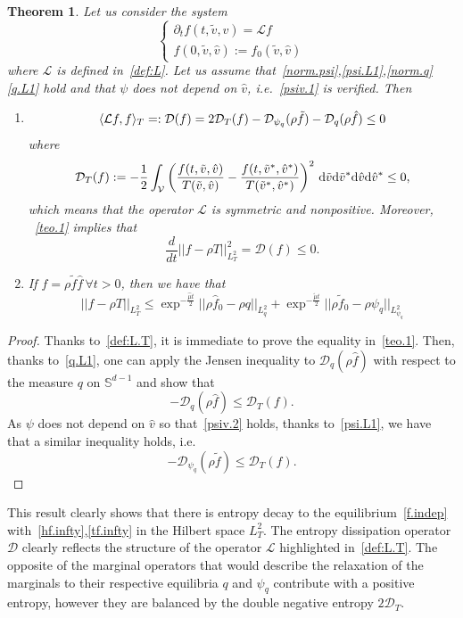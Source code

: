 \documentclass[a4paper]{article}
\theoremstyle{Theorem}\newtheorem{proposition}{Proposition}[section]
\theoremstyle{Remark}\newtheorem{remark}{Remark}[section]
\theoremstyle{Theorem}\newtheorem{theorem}{Theorem}[section]
\DeclarePairedDelimiter\ave{\langle}{\rangle}
\newcommand{\hv}{\hat{v}}
\newcommand{\tv}{\tilde{v}}
\newcommand{\hf}{\hat{f}}
\newcommand{\tf}{\tilde{f}}
\newcommand{\hmu}{\hat{\mu}}
\newcommand{\tmu}{\tilde{\mu}}
\newcommand{\intV}{\int_{\mathcal{V}}}
\begin{document}
\begin{theorem}
Let us consider the system
\begin{equation*}
    \begin{cases}
        \partial_t f (t,\tv,\hv) = \mathcal{L}f\\ %
        f(0,\tv,\hv):=f_0(\tv,\hv)
    \end{cases}
\end{equation*}
where $\mathcal{L}$ is defined in~\eqref{def:L}. Let us assume that~\eqref{norm.psi},\eqref{psi.L1},\eqref{norm.q}\eqref{q.L1} hold and that $\psi$ does not depend on $\hv$, i.e.~\eqref{psiv.1} is verified. Then
\begin{enumerate}
    \item \begin{equation}\label{teo.1}
\begin{split}
\ave{\mathcal{L}f,f}_T %
=: \mathcal{D}(f)=2\mathcal{D}_T(f)-\mathcal{D}_{\psi_q}(\rho \tf)-\mathcal{D}_q(\rho \hf)  \le 0
\end{split}
\end{equation}
where
\begin{equation*}
   \mathcal{D}_T(f) := -\dfrac{1}{2}\intV \left(\dfrac{f(t,\tv,\hv)}{T(\tv,\hv)}-\dfrac{f(t,\tv^*,\hv^*)}{T(\tv^*,\hv^*)}\right)^2 \, {\rm d}\tv {\rm d}\tv^*{\rm d}\hv {\rm d}\hv^* \le 0,
\end{equation*}
which means that the operator $\mathcal{L}$ is symmetric and nonpositive.
Moreover, ~\eqref{teo.1} implies that
\[
\dfrac{d}{dt} ||f-\rho T||^2_{L^2_T} =\mathcal{D}(f) \le 0.%
\]
\item If $f=\rho \tf \hf \, \forall t>0$, then we have that
\[
||f-\rho T||_{L^2_T} \le \exp^{-\frac{\hmu t}{2}}||\rho \hf_0-\rho q||_{L^2_q} + \exp^{-\frac{\tmu t}{2}}||\rho \tf_0-\rho \psi_q||_{L^2_{\psi_q}}
\]
\end{enumerate}
\end{theorem}
\begin{proof}
 Thanks to~\eqref{def:L.T}, it is immediate to prove the equality in~\eqref{teo.1}. 
 Then, thanks to~\eqref{q.L1}, one can apply the Jensen inequality to $\mathcal{D}_q(\rho\hf)$ with respect to the measure $q$ on $\mathbb{S}^{d-1}$ and show that
 \[
 -\mathcal{D}_q(\rho \hf) \le \mathcal{D}_T(f).
 \]
 As $\psi$ does not depend on $\hv$ so that~\eqref{psiv.2} holds, thanks to~\eqref{psi.L1}, we have that a similar inequality holds, i.e.
 \[
 -\mathcal{D}_{\psi_q}(\rho \tf) \le \mathcal{D}_T(f).
 \]
\end{proof}
This result clearly shows that there is entropy decay to the equilibrium~\eqref{f.indep} with~\eqref{hf.infty},\eqref{tf.infty} in the Hilbert space $L^2_T$. The entropy dissipation operator $\mathcal{D}$ clearly reflects the structure of the operator $\mathcal{L}$ highlighted in~\eqref{def:L.T}. The opposite of the marginal operators that would describe the relaxation of the marginals to their respective equilibria $q$ and $\psi_q$ contribute with a positive entropy, however they are balanced by the double negative entropy $2\mathcal{D}_T$.
\end{document}
